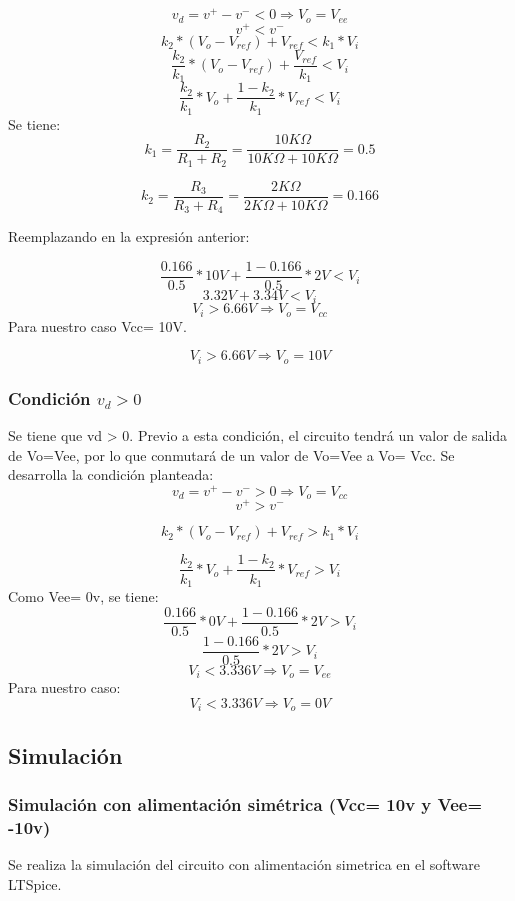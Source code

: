 \[v_d = v^+ - v^- < 0 \Rightarrow V_o = V_{ee}\]
\[v^+ < v^- \]
\[k_2 * (V_o - V_{ref}) + V_{ref} < k_1 * V_i\]
\[\frac{k_2}{k_1} * (V_o - V_{ref}) + \frac{V_{ref}}{k_1} < V_i \]
\[\frac{k_2}{k_1} * V_o + \frac{1 - k_2}{k_1} * V_{ref} < V_i \]
Se tiene:
\[ k_1 = \frac{R_2}{R_1 + R_2} = \frac{10K\Omega}{10K\Omega + 10K\Omega} = 0.5\]

\[ k_2 = \frac{R_3}{R_3 + R_4} = \frac{2K\Omega}{2K\Omega + 10K\Omega} = 0.166\]

Reemplazando en la expresión anterior:

\[\frac{0.166}{0.5} * 10V + \frac{1 - 0.166}{0.5} * 2V < V_i \]
\[3.32V + 3.34V < V_i \]
\[V_i > 6.66V \Rightarrow V_o = V_{cc}\]
Para nuestro caso Vcc= 10V.

\[V_i > 6.66V \Rightarrow V_o = 10V\]

\subsubsection{Condición \texorpdfstring{$v_d > 0$}{vd > 0}}
Se tiene que vd > 0. Previo a esta condición, el circuito tendrá un valor de salida de Vo=Vee, por lo que conmutará de un valor de Vo=Vee a Vo= Vcc. Se desarrolla la condición planteada:
\[v_d = v^+ - v^- > 0 \Rightarrow V_o = V_{cc}\]
\[v^+ > v^-\]

\[ k_2 * (V_o - V_{ref}) + V_{ref} > k_1 * V_i\]

\[\frac{k_2}{k_1} * V_o + \frac{1 - k_2}{k_1} * V_{ref} > V_i \]
Como Vee= 0v, se tiene:
\[\frac{0.166}{0.5} * 0V + \frac{1 - 0.166}{0.5} * 2V > V_i \]
\[\frac{1 - 0.166}{0.5} * 2V > V_i \]
\[V_i < 3.336V \Rightarrow V_o = V_{ee}\]
Para nuestro caso:
\[V_i < 3.336V \Rightarrow V_o = 0V\]

\subsection{Simulación}

\subsubsection{Simulación con alimentación simétrica (Vcc= 10v y Vee= -10v)}

Se realiza la simulación del circuito con alimentación simetrica en el software LTSpice.

